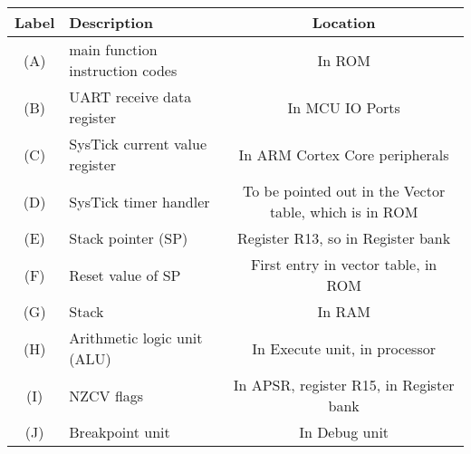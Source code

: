 \begin{tabular}{clc}
    \toprule
    \textbf{Label} & \textbf{Description}            & \textbf{Location}                                      \\ \midrule
    (A)            & main function instruction codes & In ROM                                                 \\ \midrule
    (B)            & UART receive data register      & In MCU IO Ports                                        \\ \midrule
    (C)            & SysTick current value register  & In ARM Cortex Core peripherals                         \\ \midrule
    (D)            & SysTick timer handler           & To be pointed out in the Vector table, which is in ROM \\ \midrule
    (E)            & Stack pointer (SP)              & Register R13, so in Register bank                      \\ \midrule
    (F)            & Reset value of SP               & First entry in vector table, in ROM                    \\ \midrule
    (G)            & Stack                           & In RAM                                                 \\ \midrule
    (H)            & Arithmetic logic unit (ALU)     & In Execute unit, in processor                          \\ \midrule
    (I)            & NZCV flags                      & In APSR, register R15, in Register bank                \\ \midrule
    (J)            & Breakpoint unit                 & In Debug unit                                          \\ \bottomrule
\end{tabular}
